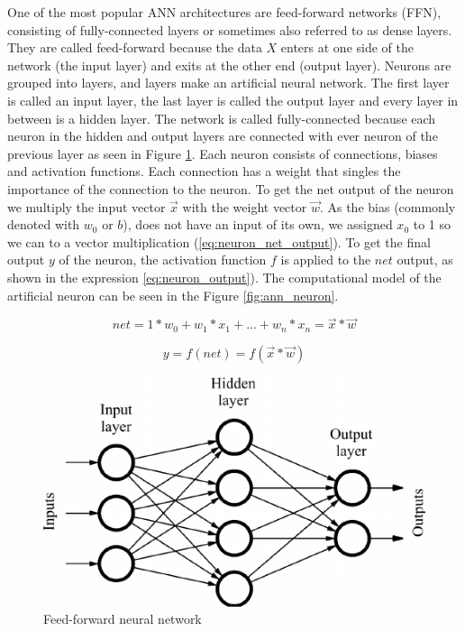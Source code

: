 \documentclass[times, utf8, diplomski]{fer}
\begin{document}
One of the most popular ANN architectures are feed-forward networks (FFN), consisting of fully-connected layers or sometimes also referred to as dense layers. They are called feed-forward because the data $X$ enters at one side of the network (the input layer) and exits at the other end (output layer). Neurons are grouped into layers, and layers make an artificial neural network. The first layer is called an input layer, the last layer is called the output layer and every layer in between is a hidden layer. The network is called fully-connected because each neuron in the hidden and output layers are connected with ever neuron of the previous layer as seen in Figure \ref{fig:ann}.
Each neuron consists of connections, biases and activation functions. Each connection has a weight that singles the importance of the connection to the neuron. To get the net output of the neuron we multiply the input vector $\vec{x}$ with the weight vector $\vec{w}$. As the bias (commonly denoted with $w_0$ or $b$), does not have an input of its own, we assigned $x_0$ to 1 so we can to a vector multiplication (\ref{eq:neuron_net_output}). To get the final output $y$ of the neuron, the activation function $f$ is applied to the $net$ output, as shown in the expression \ref{eq:neuron_output}). The computational model of the artificial neuron can be seen in the Figure \ref{fig:ann_neuron}.

\begin{equation}
    \label{eq:neuron_net_output}
    net = 1*w_0 + w_1*x_1 + ... + w_n*x_n = \vec{x} * \vec{w}
\end{equation}

\begin{equation}
    \label{eq:neuron_output}
    y = f(net) = f(\vec{x}*\vec{w})
\end{equation}

\begin{figure}
  \includegraphics[width=\linewidth]{figures/ann.png}
  \caption{Feed-forward neural network}
  \label{fig:ann}
\end{figure}
\end{document}
